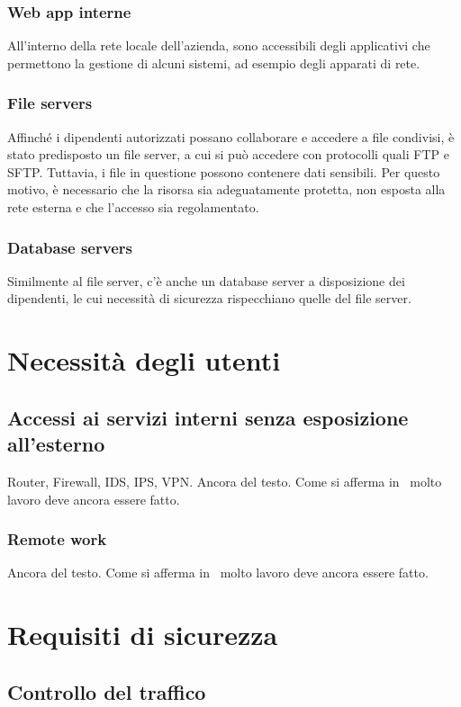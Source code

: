 \subsubsection{Web app interne}
All'interno della rete locale dell'azienda, sono accessibili degli applicativi che permettono la gestione di alcuni sistemi, ad esempio degli apparati di rete.
\subsubsection{File servers}
Affinché i dipendenti autorizzati possano collaborare e accedere a file condivisi, è stato predisposto un file server, a cui si può accedere con protocolli quali FTP \cite[RFC0791]{RFC0959} e SFTP. Tuttavia, i file in questione possono contenere dati sensibili. Per questo motivo, è necessario che la risorsa sia adeguatamente protetta, non esposta alla rete esterna e che l'accesso sia regolamentato.

\subsubsection{Database servers}
Similmente al file server, c'è anche un database server a disposizione dei dipendenti, le cui necessità di sicurezza rispecchiano quelle del file server.

\section{Necessità degli utenti}
\subsection{Accessi ai servizi interni senza esposizione all'esterno}
Router, Firewall, IDS, IPS, VPN. Ancora del testo. Come si afferma in~\cite{jones96analysis} molto lavoro deve ancora essere fatto.
\subsubsection{Remote work}
Ancora del testo. Come si afferma in~\cite{jones96analysis} molto lavoro deve ancora essere fatto.

\section{Requisiti di sicurezza}
\subsection{Controllo del traffico}
